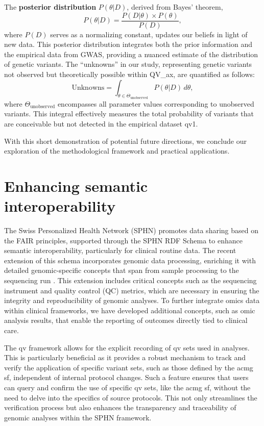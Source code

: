 The \textbf{posterior distribution} \( P(\theta|D) \), derived from Bayes' theorem,
$$P(\theta|D) = \frac{P(D|\theta) \times P(\theta)}{P(D)},$$
where \( P(D) \) serves as a normalizing constant, updates our beliefs in light of new data. This posterior distribution integrates both the prior information and the empirical data from GWAS, providing a nuanced estimate of the distribution of genetic variants.
The ``unknowns'' in our study, representing genetic variants not observed but theoretically possible within QV\_ax, are quantified as follows:
$$
\text{Unknowns} = \int_{\theta \in \Theta_{\text{unobserved}}} P(\theta|D) \, d\theta,
$$
where \( \Theta_{\text{unobserved}} \) encompasses all parameter values corresponding to unobserved variants. 
This integral effectively measures the total probability of variants that are conceivable but not detected in the empirical dataset \ac{qv}1.

With this short demonstration of potential future directions, we conclude our exploration of the methodological framework and practical applications.

\section{Enhancing semantic interoperability}
The Swiss Personalized Health Network (SPHN) promotes data sharing based on the FAIR principles, supported through the SPHN RDF Schema to enhance semantic interoperability, particularly for clinical routine data. 
The recent extension of this schema incorporates genomic data processing, enriching it with detailed genomic-specific concepts that span from sample processing to the sequencing run \cite{van2023bridging}.
This extension includes critical concepts such as the sequencing instrument and quality control (QC) metrics, which are necessary in ensuring the integrity and reproducibility of genomic analyses. To further integrate omics data within clinical frameworks, we have developed additional concepts, such as omic analysis results, that enable the reporting of outcomes directly tied to clinical care.

The \ac{qv} framework allows for the explicit recording of \ac{qv} sets used in analyses. 
This is particularly beneficial as it provides a robust mechanism to track and verify the application of specific variant sets, such as those defined by the \ac{acmg} \ac{sf}, independent of internal protocol changes. 
Such a feature ensures that users can query and confirm the use of specific \ac{qv} sets, like the \ac{acmg} \ac{sf}, without the need to delve into the specifics of source protocols. 
This not only streamlines the verification process but also enhances the transparency and traceability of genomic analyses within the SPHN framework.

